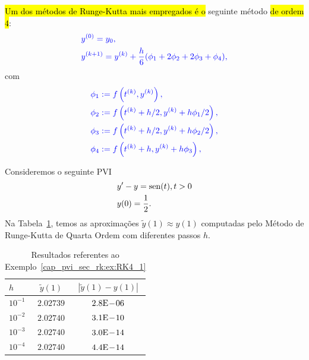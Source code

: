 \hl{Um dos métodos de Runge-Kutta mais empregados é o} seguinte método \hl{de ordem $4$}:
\begin{equation}\label{cap_pvi_sec_rk:eq:iter_rk4}\color{blue}\begin{aligned}
    &y^{(0)} = y_0,\\
    &y^{(k+1)} = y^{(k)} + \frac{h}{6}(\phi_1 + 2\phi_2 + 2\phi_3 + \phi_4),
  \end{aligned}
\end{equation}
com
\begin{subequations}\hleq
  \begin{align}
    \phi_1 &:= f\left(t^{(k)}, y^{(k)}\right),\\
    \phi_2 &:= f\left(t^{(k)}+h/2, y^{(k)}+h\phi_1/2\right),\\
    \phi_3 &:= f\left(t^{(k)}+h/2, y^{(k)}+h\phi_2/2\right),\\
    \phi_4 &:= f\left(t^{(k)}+h, y^{(k)}+h\phi_3\right),
  \end{align}
\end{subequations}

\begin{ex}\label{cap_pvi_sec_rk:ex:RK4_1}
  Consideremos o seguinte PVI
  \begin{subequations}
    \begin{align}
      &y' - y = \operatorname{sen}(t), t>0\\
      &y(0) = \frac{1}{2}.
    \end{align}
  \end{subequations}
  Na Tabela~\ref{cap_pvi_sec_rk:tab:ex_RK4_1}, temos as aproximações $\tilde{y}(1) \approx y(1)$ computadas pelo Método de Runge-Kutta de Quarta Ordem com diferentes passos $h$.
 
  \begin{table}[H]
    \centering
    \begin{tabular}{l|cc}
      $h$ & $\tilde{y}(1)$ & $|\tilde{y}(1)-y(1)|$\\\hline
      $10^{-1}$ & $2.02739$ & $2.8\mathrm{E}\!-\!06$ \\
      $10^{-2}$ & $2.02740$ & $3.1\mathrm{E}\!-\!10$ \\
      $10^{-3}$ & $2.02740$ & $3.0\mathrm{E}\!-\!14$ \\
      $10^{-4}$ & $2.02740$ & $4.4\mathrm{E}\!-\!14$ \\\hline
    \end{tabular}
    \caption{Resultados referentes ao Exemplo~\ref{cap_pvi_sec_rk:ex:RK4_1}}
    \label{cap_pvi_sec_rk:tab:ex_RK4_1}
  \end{table}
\end{ex}

